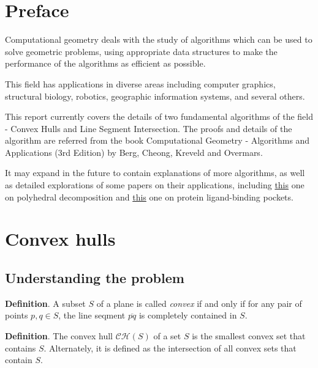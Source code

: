\documentclass{article}
\begin{document}
\graphicspath{ {./algsimgs/} }
\maketitle
\tableofcontents


\vspace{3em}
\section{Preface}

Computational geometry deals with the study of algorithms which can be used to solve geometric problems, using appropriate data structures to make the performance of the algorithms as efficient as possible.

This field has applications in diverse areas including computer graphics, structural biology, robotics, geographic information systems, and several others. 

This report currently covers the details of two fundamental algorithms of the field - Convex Hulls and Line Segment Intersection. The proofs and details of the algorithm are referred from the book Computational Geometry - Algorithms and Applications (3rd Edition) by Berg, Cheong, Kreveld and Overmars.

It may expand in the future to contain explanations of more algorithms, as well as detailed explorations of some papers on their applications, including \href{https://docs.lib.purdue.edu/cstech/842}{this} one on polyhedral decomposition and \href{https://doi.org/10.1186/1472-6807-14-18}{this} one on protein ligand-binding pockets.

\pagebreak
\section{Convex hulls}

\subsection{Understanding the problem}

\textbf{Definition}. A subset $S$ of a plane is called \emph{convex} if and only if for any pair of points $p, q \in S$, the line seqment $\overline{pq}$ is completely contained in $S$.

\textbf{Definition}. The convex hull $\mathcal{CH}(S)$ of a set $S$ is the smallest convex set that contains $S$. Alternately, it is defined as the intersection of all convex sets that contain $S$.
\end{document}
